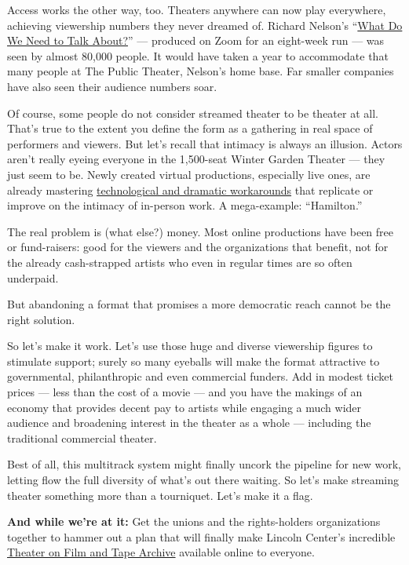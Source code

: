 Access works the other way, too. Theaters anywhere can now play
everywhere, achieving viewership numbers they never dreamed of. Richard
Nelson's
``\href{https://www.nytimes3xbfgragh.onion/2020/04/30/theater/what-do-we-need-to-talk-about-review.html}{What
Do We Need to Talk About?}'' --- produced on Zoom for an eight-week run
--- was seen by almost 80,000 people. It would have taken a year to
accommodate that many people at The Public Theater, Nelson's home base.
Far smaller companies have also seen their audience numbers soar.

Of course, some people do not consider streamed theater to be theater at
all. That's true to the extent you define the form as a gathering in
real space of performers and viewers. But let's recall that intimacy is
always an illusion. Actors aren't really eyeing everyone in the
1,500-seat Winter Garden Theater --- they just seem to be. Newly created
virtual productions, especially live ones, are already mastering
\href{https://theatreforone.com/nowplaying}{technological and dramatic
workarounds} that replicate or improve on the intimacy of in-person
work. A mega-example: ``Hamilton.''

The real problem is (what else?) money. Most online productions have
been free or fund-raisers: good for the viewers and the organizations
that benefit, not for the already cash-strapped artists who even in
regular times are so often underpaid.

But abandoning a format that promises a more democratic reach cannot be
the right solution.

So let's make it work. Let's use those huge and diverse viewership
figures to stimulate support; surely so many eyeballs will make the
format attractive to governmental, philanthropic and even commercial
funders. Add in modest ticket prices --- less than the cost of a movie
--- and you have the makings of an economy that provides decent pay to
artists while engaging a much wider audience and broadening interest in
the theater as a whole --- including the traditional commercial theater.

Best of all, this multitrack system might finally uncork the pipeline
for new work, letting flow the full diversity of what's out there
waiting. So let's make streaming theater something more than a
tourniquet. Let's make it a flag.

\textbf{And while we're at it:} Get the unions and the rights-holders
organizations together to hammer out a plan that will finally make
Lincoln Center's incredible
\href{https://www.nypl.org/about/divisions/theatre-film-and-tape-archive}{Theater
on Film and Tape Archive} available online to everyone.

